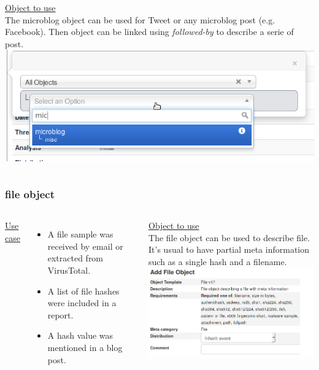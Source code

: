 \begin{frame}
\begin{columns}[totalwidth=\textwidth]
        \underline{Object to use}\\
        The microblog object can be used for Tweet or any microblog post (e.g. Facebook). Then object can be linked using {\it followed-by} to describe a serie of post.\\
        \includegraphics[scale=0.15]{microblog.png}
\end{columns}
\end{frame}


\begin{frame}
\frametitle{file object}
\begin{columns}[totalwidth=\textwidth]
        \underline{Use case}\\
        \begin{itemize}
                \item A file sample was received by email or extracted from VirusTotal.
                \item A list of file hashes were included in a report.
                \item A hash value was mentioned in a blog post.
        \end{itemize}
        \underline{Object to use}\\
        The file object can be used to describe file. It's usual to have partial meta information such as a single hash and a filename.\\
        \includegraphics[scale=0.25]{fileobject.png}
\end{columns}
\end{frame}

